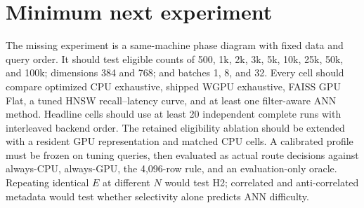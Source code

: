 \section{Minimum next experiment}
{\small The missing experiment is a same-machine phase diagram with fixed data and query order. It should test eligible counts of 500, 1k, 2k, 3k, 5k, 10k, 25k, 50k, and 100k; dimensions 384 and 768; and batches 1, 8, and 32. Every cell should compare optimized CPU exhaustive, shipped WGPU exhaustive, FAISS GPU Flat, a tuned HNSW recall--latency curve, and at least one filter-aware ANN method. Headline cells should use at least 20 independent complete runs with interleaved backend order. The retained eligibility ablation should be extended with a resident GPU representation and matched CPU cells. A calibrated profile must be frozen on tuning queries, then evaluated as actual route decisions against always-CPU, always-GPU, the 4,096-row rule, and an evaluation-only oracle. Repeating identical \(E\) at different \(N\) would test H2; correlated and anti-correlated metadata would test whether selectivity alone predicts ANN difficulty.}

